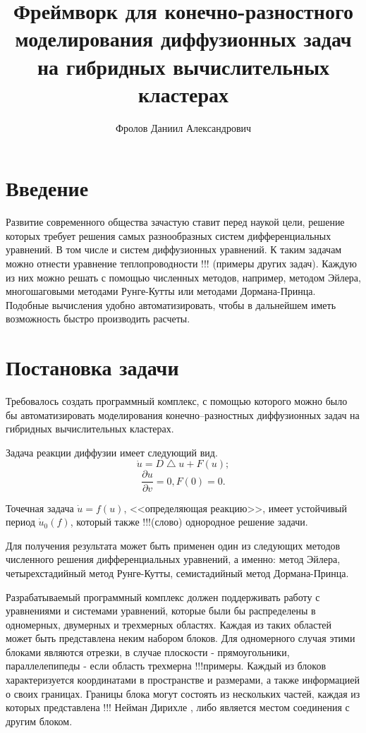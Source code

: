 \documentclass[a4paper, 14pt]{article}
\title{Фреймворк для конечно-разностного моделирования диффузионных задач на гибридных вычислительных кластерах}
\author{Фролов Даниил Александрович}
\theoremstyle{definition}
\begin{document}
\fontsize{14}{16pt}\selectfont

\section*{Введение}

\par Развитие современного общества зачастую ставит перед наукой цели, решение которых требует решения самых разнообразных систем дифференциальных уравнений. В том числе и систем диффузионных уравнений. К таким задачам можно отнести уравнение теплопроводности !!! (примеры других задач). Каждую из них можно решать с помощью численных методов, например, методом Эйлера, многошаговыми методами Рунге-Кутты или методами Дормана-Принца. Подобные вычисления удобно автоматизировать, чтобы в дальнейшем иметь возможность быстро производить расчеты.

\newpage
\section{Постановка задачи}

\par Требовалось создать программный комплекс, с помощью которого можно было бы автоматизировать моделирования конечно--разностных диффузионных задач на гибридных вычислительных кластерах.

\par Задача реакции диффузии имеет следующий вид.
$$\dot u = D \bigtriangleup u + F(u);$$
$$\frac{\partial u}{\partial v} = 0, F(0) = 0.$$

\par Точечная задача $\dot u = f(u)$, <<определяющая реакцию>>, имеет устойчивый период $\dot u_0 (f)$, который также !!!(слово) однородное решение задачи.

\par Для получения результата может быть применен один из следующих методов численного решения дифференциальных уравнений, а именно: метод Эйлера, четырехстадийный метод Рунге-Кутты, семистадийный метод Дормана-Принца.

\par Разрабатываемый программный комплекс должен поддерживать работу с уравнениями и системами уравнений, которые были бы распределены в одномерных, двумерных и трехмерных областях. Каждая из таких областей может быть представлена неким набором блоков. Для одномерного случая этими блоками являются отрезки, в случае плоскости - прямоугольники, параллелепипеды - если область трехмерна !!!примеры. Каждый из блоков характеризуется координатами в пространстве и размерами, а также информацией о своих границах. Границы блока могут состоять из нескольких частей, каждая из которых представлена !!! Нейман Дирихле , либо является местом соединения с другим блоком.
\end{document}
